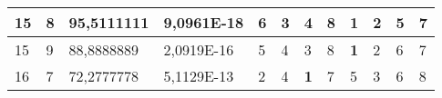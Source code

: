 \documentclass[conference]{IEEEtran}
\begin{document}
\begin{table*}[]
\begin{tabular}{|llll|llllllll|}
\multicolumn{1}{|l|}{15}                                                    & \multicolumn{1}{l|}{8}                                                        & \multicolumn{1}{l|}{95,5111111}                                                   & 9,0961E-18                     & \multicolumn{1}{l|}{6}                                                  & \multicolumn{1}{l|}{3}                                                  & \multicolumn{1}{l|}{4}                                                  & \multicolumn{1}{l|}{8}                                                  & \multicolumn{1}{l|}{\textbf{1}}                                         & \multicolumn{1}{l|}{2}                                                  & \multicolumn{1}{l|}{5}                                                  & 7                          \\ \hline
\multicolumn{1}{|l|}{15}                                                    & \multicolumn{1}{l|}{9}                                                        & \multicolumn{1}{l|}{88,8888889}                                                   & 2,0919E-16                     & \multicolumn{1}{l|}{5}                                                  & \multicolumn{1}{l|}{4}                                                  & \multicolumn{1}{l|}{3}                                                  & \multicolumn{1}{l|}{8}                                                  & \multicolumn{1}{l|}{\textbf{1}}                                         & \multicolumn{1}{l|}{2}                                                  & \multicolumn{1}{l|}{6}                                                  & 7                          \\ \hline
\multicolumn{1}{|l|}{16}                                                    & \multicolumn{1}{l|}{7}                                                        & \multicolumn{1}{l|}{72,2777778}                                                   & 5,1129E-13                     & \multicolumn{1}{l|}{2}                                                  & \multicolumn{1}{l|}{4}                                                  & \multicolumn{1}{l|}{\textbf{1}}                                         & \multicolumn{1}{l|}{7}                                                  & \multicolumn{1}{l|}{5}                                                  & \multicolumn{1}{l|}{3}                                                  & \multicolumn{1}{l|}{6}                                                  & 8                          \\ \hline

\end{tabular}
\end{table*}
\end{document}
